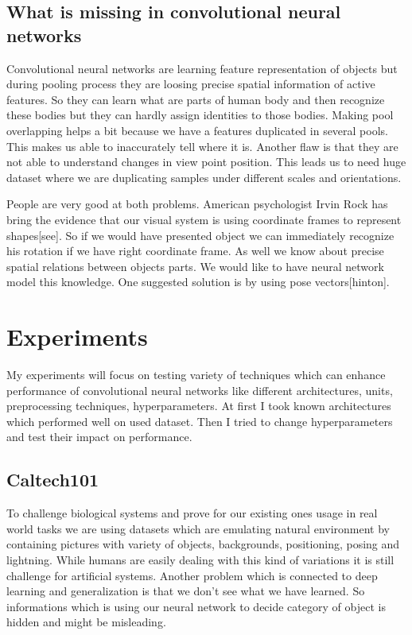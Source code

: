 \section{What is missing in convolutional neural networks}
Convolutional neural networks are learning feature representation of objects but during pooling process they are loosing precise spatial information of active features. So they can learn what are parts of human body and then recognize these bodies but they can hardly assign identities to those bodies. Making pool overlapping helps a bit because we have a features duplicated in several pools. This makes us able to inaccurately tell where it is. Another flaw is that they are not able to understand changes in view point position. This leads us to need huge dataset where we are duplicating samples under different scales and orientations.

People are very good at both problems. American psychologist Irvin Rock has bring the evidence that our visual system is using coordinate frames to represent shapes[see]. So if we would have presented object we can immediately recognize his rotation if we have right coordinate frame. As well we know about precise spatial relations between objects parts. We would like to have neural network model this knowledge. One suggested solution is by using pose vectors[hinton].

\chapter{Experiments}
My experiments will focus on testing variety of techniques which can enhance performance of convolutional neural networks like different architectures, units, preprocessing techniques, hyperparameters. At first I took known architectures which performed well on used dataset. Then I tried to change hyperparameters and test their impact on performance.

\section{Caltech101}
To challenge biological systems and prove for our existing ones usage in real world tasks we are using datasets which are emulating natural environment by containing pictures with variety of objects, backgrounds, positioning, posing and lightning. While humans are easily dealing with this kind of variations it is still challenge for artificial systems. Another problem which is connected to deep learning and generalization is that we don't see what we have learned. So informations which is using our neural network to decide category of object is hidden and might be misleading.

